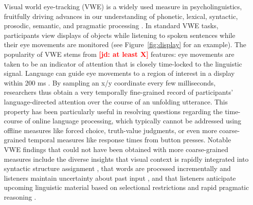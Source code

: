 \documentclass[10pt,letterpaper]{article}
\newcommand{\figref}[1]{Figure~\ref{#1}}
\newcommand{\jd}[1]{\textcolor{Red}{\textbf{[jd: #1]}}}
\begin{document}
Visual world eye-tracking (VWE) is a widely used measure in psycholinguistics, fruitfully driving advances in our understanding of phonetic, lexical, syntactic, prosodic, semantic, and pragmatic processing  \cite{tanenhaus1995,Allopenna1998,altmann1999,clayards2008,SedivyEtAl1999:Achieving-Incremental-Semantic-,huang2009,kurumada2014}. %
In standard VWE tasks, participants view displays of objects while listening to spoken sentences while their eye movements are monitored (see \figref{fig:display} for an example). The popularity of VWE stems from \jd{at least X} features: eye movements are taken to be an indicator of attention that is closely time-locked to the linguistic signal. Language can guide eye movements to a region of interest in a display within 200 ms \cite{Allopenna1998}. By sampling an x/y coordinate every few milliseconds, researchers thus obtain a very temporally fine-grained record of participants' language-directed attention over the course of an unfolding utterance. This property has been particularly useful in resolving questions regarding the time-course of online language processing, which typically cannot be addressed using offline measures like forced choice, truth-value judgments, or even more coarse-grained temporal measures like response times from button presses. Notable VWE findings that could not have been obtained with more coarse-grained measures include the diverse insights that visual context is rapidly integrated into syntactic structure assignment \cite{tanenhaus1995,chambers2004}, that words are processed incrementally and listeners maintain uncertainty about past input \cite{Allopenna1998,clayards2008}, and that listeners anticipate upcoming linguistic material based on selectional restrictions and rapid pragmatic reasoning \cite{altmann1999,SedivyEtAl1999:Achieving-Incremental-Semantic-}.
\end{document}
